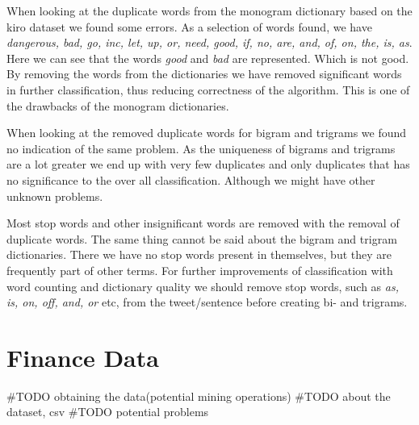 When looking at the duplicate words from the monogram dictionary based on the
kiro dataset we found some errors.
As a selection of words found, we have \textit{dangerous, bad, go, inc, let, up, or, need, good, if, no, are, and, of, on, the,
is, as}.
Here we can see that the words \textit{good} and \textit{bad} are represented.
Which is not good. By removing the words from the dictionaries we have removed
significant words in further classification, thus reducing correctness of the
algorithm. This is one of the drawbacks of the monogram dictionaries.

When looking at the removed duplicate words for bigram and trigrams we found no
indication of the same problem. As the uniqueness of bigrams and trigrams are a
lot greater we end up with very few duplicates and only duplicates that has no
significance to the over all classification. Although we might have other
unknown problems.  

Most stop words and other insignificant words are removed with the removal of
duplicate words. The same thing cannot be said about the bigram and trigram
dictionaries. There we have no stop words present in themselves, but they are
frequently part of other terms. For further improvements of classification with
word counting and dictionary quality we should remove
stop words, such as \textit{as, is, on, off, and, or} etc, from the
tweet/sentence before creating bi- and trigrams.     
%

\section{Finance Data}\label{data:finance}
#TODO obtaining the data(potential mining operations)
#TODO about the dataset, csv
#TODO potential problems 
%


